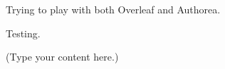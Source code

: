 \documentclass{article}
\begin{document}
Trying to play with both Overleaf and Authorea.

Testing. 

(Type your content here.)
\end{document}
